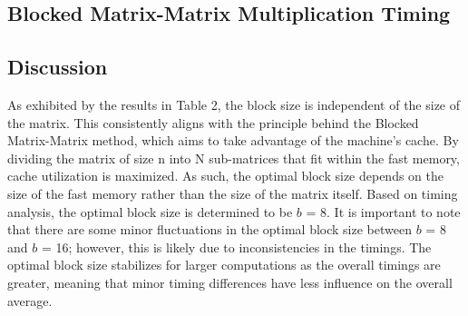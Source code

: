 \documentclass{article}
\begin{document}
\subsection{Blocked Matrix-Matrix Multiplication Timing}
\begin{table}[ht!]
    \caption{Blocked Matrix-Matrix Multiplication Timings (Seconds) on NOTS}
    \centering
\end{table}


\subsection{Discussion}

As exhibited by the results in Table 2, the block size is independent of the size of the matrix. This consistently aligns with the principle behind the Blocked Matrix-Matrix method, which aims to take advantage of the machine's cache. By dividing the matrix of size n into N sub-matrices that fit within the fast memory, cache utilization is maximized. As such, the optimal block size depends on the size of the fast memory rather than the size of the matrix itself. Based on timing analysis, the optimal block size is determined to be \( b\) = 8. It is important to note that there are some minor fluctuations in the optimal block size between \( b\) = 8 and \( b\) = 16; however, this is likely due to inconsistencies in the timings. The optimal block size stabilizes for larger computations as the overall timings are greater, meaning that minor timing differences have less influence on the overall average.
\end{document}
